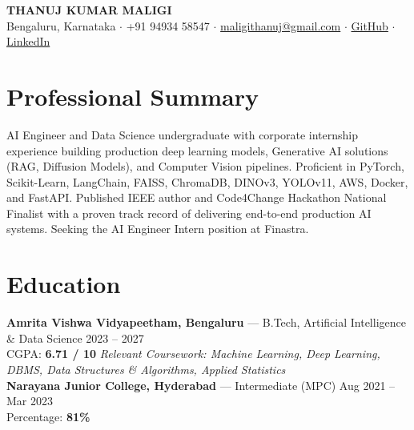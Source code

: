\documentclass[a4paper,10pt]{article}
\begin{document}

\begin{center}
{\LARGE \textbf{THANUJ KUMAR MALIGI}}\\[1pt]
Bengaluru, Karnataka $\cdot$ +91 94934 58547 $\cdot$ \href{mailto:maligithanuj@gmail.com}{maligithanuj@gmail.com} $\cdot$ \href{https://github.com/ThanujMaligi}{GitHub} $\cdot$ \href{https://www.linkedin.com/in/thanuj-kumar-maligi-8882b2288}{LinkedIn}
\end{center}


\section*{Professional Summary}
AI Engineer and Data Science undergraduate with corporate internship experience building production deep learning models, Generative AI solutions (RAG, Diffusion Models), and Computer Vision pipelines. Proficient in PyTorch, Scikit-Learn, LangChain, FAISS, ChromaDB, DINOv3, YOLOv11, AWS, Docker, and FastAPI. Published IEEE author and Code4Change Hackathon National Finalist with a proven track record of delivering end-to-end production AI systems. Seeking the AI Engineer Intern position at Finastra.


\section*{Education}
\textbf{Amrita Vishwa Vidyapeetham, Bengaluru} --- B.Tech, Artificial Intelligence \& Data Science \hfill 2023 -- 2027\\
CGPA: \textbf{6.71 / 10} \hfill \textit{Relevant Coursework: Machine Learning, Deep Learning, DBMS, Data Structures \& Algorithms, Applied Statistics}\\
\textbf{Narayana Junior College, Hyderabad} --- Intermediate (MPC) \hfill Aug 2021 -- Mar 2023\\
Percentage: \textbf{81\%}

\end{document}
